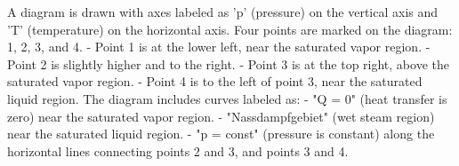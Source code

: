 A diagram is drawn with axes labeled as 'p' (pressure) on the vertical axis and 'T' (temperature) on the horizontal axis. Four points are marked on the diagram: 1, 2, 3, and 4.  
- Point 1 is at the lower left, near the saturated vapor region.  
- Point 2 is slightly higher and to the right.  
- Point 3 is at the top right, above the saturated vapor region.  
- Point 4 is to the left of point 3, near the saturated liquid region.  
The diagram includes curves labeled as:  
- "Q = 0" (heat transfer is zero) near the saturated vapor region.  
- "Nassdampfgebiet" (wet steam region) near the saturated liquid region.  
- "p = const" (pressure is constant) along the horizontal lines connecting points 2 and 3, and points 3 and 4.